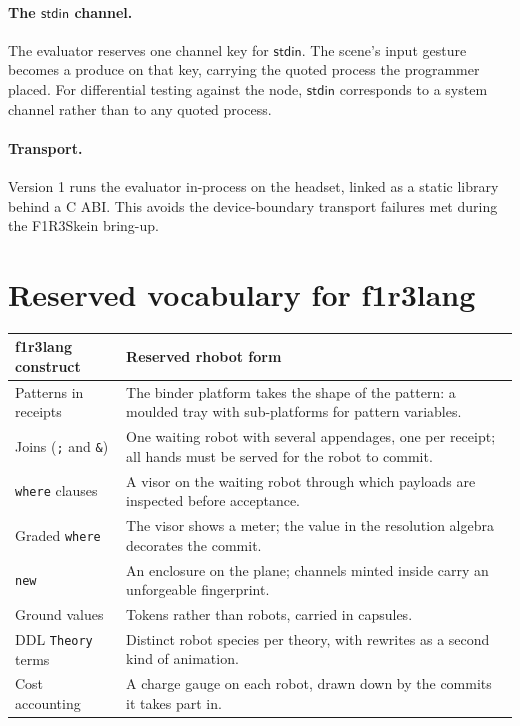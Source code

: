 \documentclass[11pt]{article}
\begin{document}
\paragraph{The $\mathsf{stdin}$ channel.} The evaluator reserves one channel key for
$\mathsf{stdin}$. The scene's input gesture becomes a produce on that key, carrying the quoted
process the programmer placed. For differential testing against the node, $\mathsf{stdin}$
corresponds to a system channel rather than to any quoted process.

\paragraph{Transport.} Version 1 runs the evaluator in-process on the headset, linked as a
static library behind a C ABI. This avoids the device-boundary transport failures met during
the F1R3Skein bring-up.

\section{Reserved vocabulary for f1r3lang}\label{sec:reserved}

\begin{table}[h]
\centering\small
\begin{tabularx}{\linewidth}{@{}l X@{}}
\toprule
f1r3lang construct & Reserved rhobot form\\
\midrule
Patterns in receipts & The binder platform takes the shape of the pattern: a moulded tray
  with sub-platforms for pattern variables.\\
Joins (\texttt{;} and \texttt{\&}) & One waiting robot with several appendages, one per
  receipt; all hands must be served for the robot to commit.\\
\texttt{where} clauses & A visor on the waiting robot through which payloads are inspected
  before acceptance.\\
Graded \texttt{where} & The visor shows a meter; the value in the resolution algebra
  decorates the commit.\\
\texttt{new} & An enclosure on the plane; channels minted inside carry an unforgeable
  fingerprint.\\
Ground values & Tokens rather than robots, carried in capsules.\\
DDL \texttt{Theory} terms & Distinct robot species per theory, with rewrites as a second
  kind of animation.\\
Cost accounting & A charge gauge on each robot, drawn down by the commits it takes part in.\\
\bottomrule
\end{tabularx}
\end{table}
\end{document}
